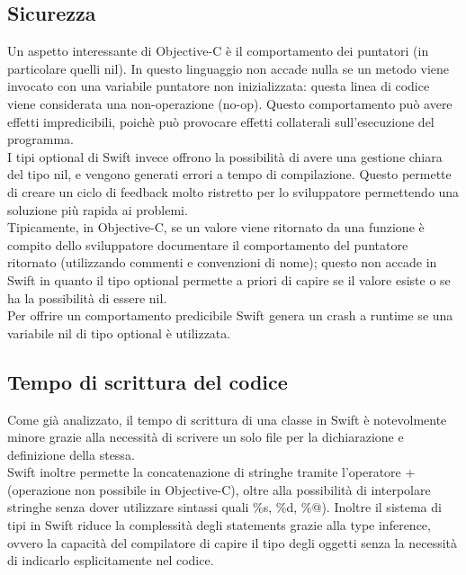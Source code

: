 \subsection{Sicurezza} 
Un aspetto interessante di Objective-C è il comportamento dei puntatori (in particolare quelli nil). In questo linguaggio non accade nulla se un metodo viene invocato con una variabile puntatore non inizializzata: questa linea di codice viene considerata una non-operazione (no-op). Questo comportamento può avere effetti impredicibili, poichè può provocare effetti collaterali sull'esecuzione del programma.\\
I tipi optional di Swift invece offrono la possibilità di avere una gestione chiara del tipo nil, e vengono generati errori a tempo di compilazione. Questo permette di creare un ciclo di feedback molto ristretto per lo sviluppatore permettendo una soluzione più rapida ai problemi.\\
Tipicamente, in Objective-C, se un valore viene ritornato da una funzione è compito dello sviluppatore documentare il comportamento del puntatore ritornato (utilizzando commenti e convenzioni di nome); questo non accade in Swift in quanto il tipo optional permette a priori di capire se il valore esiste o se ha la possibilità di essere nil.\\ Per offrire un comportamento predicibile Swift genera un crash a runtime se una variabile nil di tipo optional è utilizzata.\\
\subsection{Tempo di scrittura del codice}
Come già analizzato, il tempo di scrittura di una classe in Swift è notevolmente minore grazie alla necessità di scrivere un solo file per la dichiarazione e definizione della stessa.\\Swift inoltre permette la concatenazione di stringhe tramite l'operatore + (operazione non possibile in Objective-C), oltre alla possibilità di interpolare stringhe senza dover utilizzare sintassi quali \%s, \%d, \%@). Inoltre il sistema di tipi in Swift riduce la complessità degli statements grazie alla type inference, ovvero la capacità del compilatore di capire il tipo degli oggetti senza la necessità di indicarlo esplicitamente nel codice.
